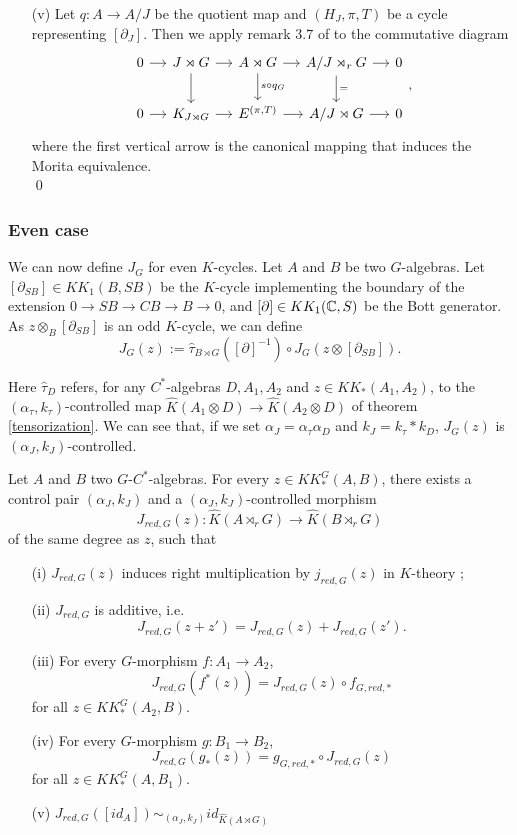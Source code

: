 \begin{dem}
\begin{enumerate}
\item[(v)] Let $q:A\rightarrow A/J$ be the quotient map and $(H_J, \pi, T)$ be a cycle representing $[\partial_J]$. Then we apply remark $3.7$ of \cite{OY2} to the commutative diagram
\[\begin{tikzcd}[column sep = small]
0\arrow{r} & J\rtimes G\arrow{r}\arrow{d} & A\rtimes G \arrow{r}\arrow{d}{s\circ q_G}& A/J\rtimes_r G\arrow{r}\arrow{d}{=} & 0\\
0\arrow{r} & K_{J\rtimes G}\arrow{r} & E^{(\pi,T)} \arrow{r}& A/J\rtimes G\arrow{r} & 0
\end{tikzcd},\]
where the first vertical arrow is the canonical mapping that induces the Morita equivalence. \\
\qed
\end{enumerate}
\end{dem}

\subsubsection{Even case}

We can now define $J_G$ for even $K$-cycles. Let $A$ and $B$ be two $G$-algebras. Let $[\partial_{SB}]\in KK_1(B,SB)$ be the $K$-cycle implementing the boundary of the extension $0\rightarrow SB\rightarrow CB\rightarrow B\rightarrow 0$, and $[\partial]\in KK_1(\mathbb C,S)$ be the Bott generator. As $z\otimes_B [\partial_{SB}]$ is an odd $K$-cycle, we can define
\[J_G(z):= \hat\tau_{B\rtimes G}([\partial]^{-1})\circ J_G(z\otimes[\partial_{SB}]).\] 

Here $\hat\tau_D$ refers, for any $C^*$-algebras $D,A_1,A_2$ and $z\in KK_*(A_1,A_2)$, to the $(\alpha_\tau,k_\tau)$-controlled map $\hat K (A_1\otimes D )\rightarrow \hat K(A_2\otimes D)$ of theorem \ref{tensorization}. We can see that, if we set $\alpha_J=\alpha_\tau \alpha_D$ and $k_J=k_\tau * k_D$, $J_G(z)$ is $(\alpha_J,k_J)$-controlled.\\

\begin{prop}\label{Kasparov}
Let $A$ and $B$ two $G$-$C^*$-algebras. For every $z\in KK^G_*(A,B)$, there exists a control pair $(\alpha_J,k_J)$ and a $(\alpha_J,k_J)$-controlled morphism
\[J_{red,G}(z) : \hat K(A\rtimes_r G)\rightarrow \hat K(B\rtimes_r G)\]
of the same degree as $z$, such that
\begin{enumerate}
\item[(i)] $J_{red,G}(z)$ induces right multiplication by $j_{red,G}(z)$ in $K$-theory ;
\item[(ii)] $J_{red,G}$ is additive, i.e.
\[J_{red,G}(z+z')=J_{red,G}(z)+J_{red,G}(z').\]
\item[(iii)] For every $G$-morphism $f : A_1\rightarrow A_2$,
\[J_{red,G}(f^*(z))=J_{red,G}(z)\circ f_{G,red,*}\] for all $z\in KK_*^G(A_2,B)$.
\item[(iv)] For every $G$-morphism $g : B_1\rightarrow B_2$,
\[J_{red,G}(g_*(z))= g_{G,red,*}\circ J_{red,G}(z)\] for all $z\in KK_*^G(A,B_1)$.
\item[(v)] $J_{red,G}([id_A]) \sim_{(\alpha_J,k_J)} id_{\hat K(A\rtimes G)}$
\end{enumerate}
\end{prop}

